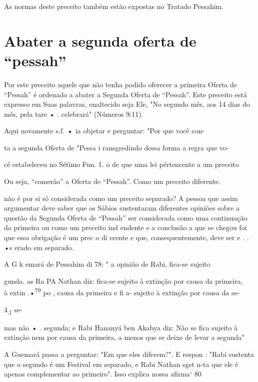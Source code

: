As normas deste preceito também estão expostas no Tratado Pessahim.

\section{Abater a segunda oferta de ``pessah''}


Por este preceito aquele que não tenha podido oferecer a primeira Oferta
de ``Pessah'' é ordenado a abater a Segunda Oferta de ``Pessah''. Este
preceito está expresso em Suas palavras, enaltecido seja Ele, "No
segundo mês, aos 14 dias do mês, pela tare • . celebrará" (Números
9:11).


Aqui novamente s.f. \textbf{•} ia objetar e perguntar: "Por que você
con-


ta a segunda Oferta de "Pessa i ransgredindo dessa forma a regra que vo-

cê estabeleceu no Sétimo Fun. 1. o de que uma lei
pértencente a um preceito



Ou seja, ``comerão'' a Oferta de ``Pessah''.
Como um preceito diferente.


não é por si só considerada como um preceito separado? A pessoa que
assim argumentar deve saber que os Sábios sustentaram diferentes
opiniões sobre a questão da Segunda Oferta de ``Pessah'' ser considerada
como uma continua­ção da primeira ou como um preceito ind endente e a
conclusão a que se che­gou foi que essa obrigação é um prec o di erente
e que, consequentemente, deve ser e . . •s erado em separado.


A G k emará de Pessahim di 78: " a opinião de Rabi, fica-se sujeito

gunda. as Ra PA Nathan diz: fica-se sujeito à extinção por causa da
primeira,\\
à extin .•\textsuperscript{79} po , causa da primeira
e fi a- sujeito à extinção por causa da se-


4\textsubscript{,1} se-

mas não • . segunda; e Rabi Hananyá ben Akabya diz: Não se fica sujeito
à extinção nem por causa da primeira, a menos que se deixe de levar a
segunda"

A Guemará passa a perguntar: "Em que eles diferem?". E respon : "Rabi
sustenta que o segundo é um Festival em separado, e Rabi Nathan sgst
n-ta que ele é apenas complementar ao primeiro". Isso explica nossa
afirma` 80

